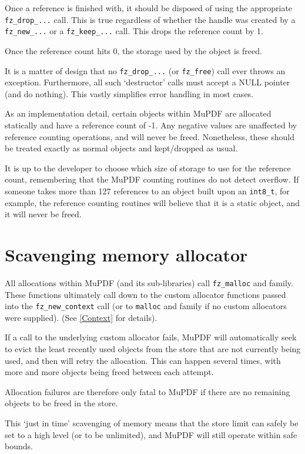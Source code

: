 \documentclass[oneside]{book}
\newcommand{\rjwref}[1] {\autoref{#1} \nameref{#1}}
\begin{document}
Once a reference is finished with, it should be disposed of using the appropriate \texttt{fz\_drop\_...} call. This is true regardless of whether the handle was created by a \texttt{fz\_new\_...} or a \texttt{fz\_keep\_...} call. This drops the reference count by 1.

Once the reference count hits 0, the storage used by the object is freed.

It is a matter of design that no \texttt{fz\_drop\_...} (or \texttt{fz\_free}) call ever throws an exception. Furthermore, all such `destructor' calls must accept a NULL pointer (and do nothing). This vastly simplifies error handling in most cases.

As an implementation detail, certain objects within MuPDF are allocated statically and have a reference count of -1. Any negative values are unaffected by reference counting operations, and will never be freed. Nonetheless, these should be treated exactly as normal objects and kept/dropped as usual.

It is up to the developer to choose which size of storage to use for the reference count, remembering that the MuPDF counting routines do not detect overflow. If someone takes more than 127 references to an object built upon an \texttt{int8\_t}, for example, the reference counting routines will believe that it is a static object, and it will never be freed.

\section{Scavenging memory allocator}

All allocations within MuPDF (and its sub-libraries) call \texttt{fz\_malloc} and family. These functions ultimately call down to the custom allocator functions passed into the \texttt{fz\_new\_context} call (or to \texttt{malloc} and family if no custom allocators were supplied). (See \rjwref{Context} for details).

If a call to the underlying custom allocator fails, MuPDF will automatically seek to evict the least recently used objects from the store that are not currently being used, and then will retry the allocation. This can happen several times, with more and more objects being freed between each attempt.

Allocation failures are therefore only fatal to MuPDF if there are no remaining objects to be freed in the store.

This `just in time' scavenging of memory means that the store limit can safely be set to a high level (or to be unlimited), and MuPDF will still operate within safe bounds.
\end{document}
